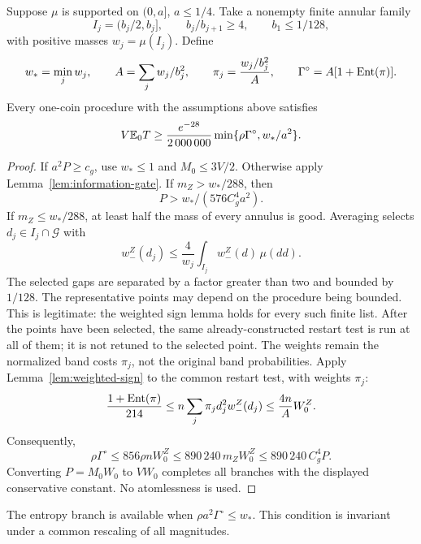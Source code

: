 \begin{proposition}
\label{prop:scaled-annular}
Suppose \(\mu\) is supported on \((0,a]\), \(a\le1/4\).
Take a nonempty finite annular family
\[
 I_j=(b_j/2,b_j],\qquad b_j/b_{j+1}\ge4,\qquad
 b_1\le1/128,
\]
with positive masses \(w_j=\mu(I_j)\).  Define
\[
 w_*=\min_jw_j,\qquad
 A=\sum_jw_j/b_j^2,\qquad
 \pi_j=\frac{w_j/b_j^2}{A},\qquad
 \Gamma^{\circ}=A[1+\operatorname{Ent}(\pi)].
\]
Every one-coin procedure with the assumptions above satisfies
\begin{equation}
 V\mathbb E_0T\ge
 \frac{e^{-28}}{2\,000\,000}
       \min\{\rho\Gamma^{\circ},w_*/a^2\}.
 \label{eq:cross-scaled-annular}
\end{equation}
\end{proposition}

\begin{proof}
If \(a^2P\ge c_g\), use \(w_*\le1\) and \(M_0\le3V/2\).
Otherwise apply Lemma~\ref{lem:information-gate}.
If \(m_Z>w_*/288\), then
\[
 P>w_*/(576C_g^4a^2).
\]
If \(m_Z\le w_*/288\), at least half the mass of every annulus is
good.  Averaging selects \(d_j\in I_j\cap\mathcal G\) with
\[
 w_-^Z(d_j)\le\frac4{w_j}\int_{I_j}w_-^Z(d)\,\mu(dd).
\]
The selected gaps are separated by a factor greater than two and
bounded by \(1/128\). The representative points may depend on the
procedure being bounded. This is legitimate: the weighted sign lemma
holds for every such finite list. After the points have been selected,
the same already-constructed restart test is run at all of them; it is
not retuned to the selected point. The weights remain the normalized
band costs $\pi_j$, not the original band probabilities.
Apply Lemma~\ref{lem:weighted-sign} to the common restart test,
with weights \(\pi_j\):
\[
 \frac{1+\operatorname{Ent}(\pi)}{214}
 \le n\sum_j\pi_jd_j^2w_-^Z(d_j)
 \le\frac{4n}{A}W_0^Z.
\]
Consequently,
\[
 \rho\Gamma^{\circ}
 \le856\rho nW_0^Z
 \le890\,240\,m_ZW_0^Z
 \le890\,240\,C_g^4P.
\]
Converting \(P=M_0W_0\) to \(VW_0\) completes all branches with the
displayed conservative constant.  No atomlessness is used.
\end{proof}

The entropy branch is available when $\rho a^2\Gamma^{\circ}\le w_*$.
This condition is invariant under a common rescaling of all magnitudes.
